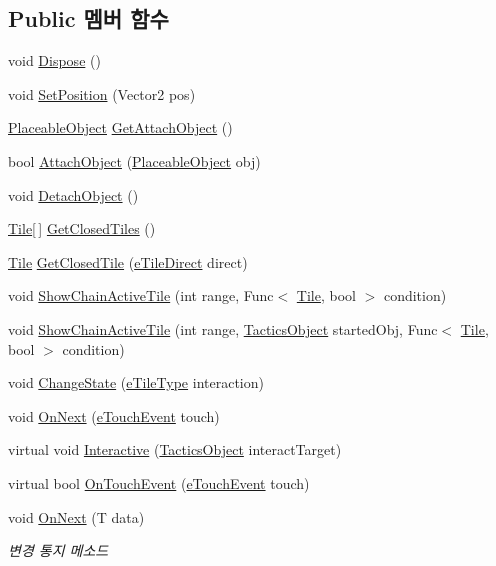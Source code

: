 \subsection*{Public 멤버 함수}
\begin{DoxyCompactItemize}
\item 
void \hyperlink{class_tile_a6e8a801e95a29156cbf32024e45c6596}{Dispose} ()
\item 
void \hyperlink{class_tile_a4d7a81b36513066aad741ed675164690}{Set\+Position} (Vector2 pos)
\item 
\hyperlink{class_placeable_object}{Placeable\+Object} \hyperlink{class_tile_a02150b69b975e8e9de1c3e10070a8dda}{Get\+Attach\+Object} ()
\item 
bool \hyperlink{class_tile_a1969ee41c320c6e7748a33374942e07e}{Attach\+Object} (\hyperlink{class_placeable_object}{Placeable\+Object} obj)
\item 
void \hyperlink{class_tile_ab8ab187ab674cfb222f761feac3b20b3}{Detach\+Object} ()
\item 
\hyperlink{class_tile}{Tile}\mbox{[}$\,$\mbox{]} \hyperlink{class_tile_a38b9f5c215f16448118e83e0d10aed05}{Get\+Closed\+Tiles} ()
\item 
\hyperlink{class_tile}{Tile} \hyperlink{class_tile_a838aaa6a94321629d04e944ed3bf8b9f}{Get\+Closed\+Tile} (\hyperlink{_tile_8cs_a082f743a62d2d8e13dac8fd38af246d7}{e\+Tile\+Direct} direct)
\item 
void \hyperlink{class_tile_acc5e0dbed92b6c57b6cd19efdb1b95aa}{Show\+Chain\+Active\+Tile} (int range, Func$<$ \hyperlink{class_tile}{Tile}, bool $>$ condition)
\item 
void \hyperlink{class_tile_af046cbcb35fa138f709cb158ade23e74}{Show\+Chain\+Active\+Tile} (int range, \hyperlink{class_tactics_object}{Tactics\+Object} started\+Obj, Func$<$ \hyperlink{class_tile}{Tile}, bool $>$ condition)
\item 
void \hyperlink{class_tile_a2bb5c747e9483b803ea65b4341ce5af6}{Change\+State} (\hyperlink{_tile_8cs_a271bc07be325bca511bcb747e0ff2fda}{e\+Tile\+Type} interaction)
\item 
void \hyperlink{class_tile_a6133171796d47353aa5d57cd336e0a07}{On\+Next} (\hyperlink{_touch_manager_8cs_ae33e321a424fe84ba8b2fdb81ad40a68}{e\+Touch\+Event} touch)
\item 
virtual void \hyperlink{class_tactics_object_a5f94ed01497a7072a2785163f4cbc57b}{Interactive} (\hyperlink{class_tactics_object}{Tactics\+Object} interact\+Target)
\item 
virtual bool \hyperlink{class_tactics_object_af34052e62ea471d21e4c601cc79ff717}{On\+Touch\+Event} (\hyperlink{_touch_manager_8cs_ae33e321a424fe84ba8b2fdb81ad40a68}{e\+Touch\+Event} touch)
\item 
void \hyperlink{interface_m_c_n_1_1_i_observer_a2f934b71aa4ddf6f936670d32c3cdff7}{On\+Next} (T data)
\begin{DoxyCompactList}\small\item\em 변경 통지 메소드 \end{DoxyCompactList}\end{DoxyCompactItemize}
